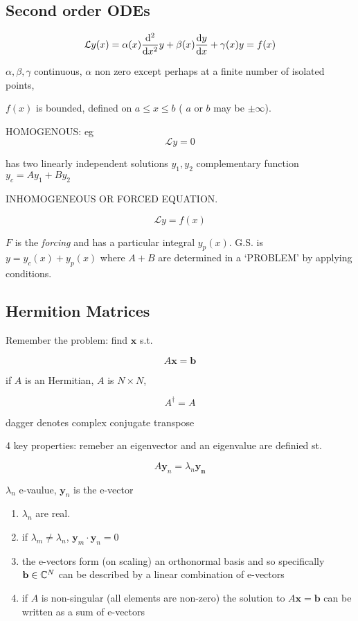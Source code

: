 \documentclass[a4paper]{article}
\begin{document}
\subsection{Second order ODEs}

\[ \mathcal{L} y(x) = \alpha(x) \frac{\mathrm{d}^{2} }{\mathrm{d} x^{2} } y + \beta(x) \frac{\mathrm{d} y }{\mathrm{d} x } + \gamma(x)  y = f(x) \]

$ \alpha, \beta, \gamma $ continuous, $ \alpha $ non zero except perhaps at a finite number of isolated points, 

$ f(x) $ is bounded, defined on $ a \leq x \leq b $ ( $ a $ or $ b $ may be $ \pm \infty $).

HOMOGENOUS: eg 
\[ \mathcal{L} y = 0  \]

has two linearly independent solutions $ y_{1},y_{2} $ complementary function $ y_{c} = Ay_{1} + By_{2} $

INHOMOGENEOUS OR FORCED EQUATION. 

\[ \mathcal{L} y = f(x)  \]

$ F $ is the \emph{forcing} and has a particular integral $ y_{p} (x) $. G.S. is $ y = y_{c}(x) + y_{p}(x) $ where $ A + B $ are determined in a `PROBLEM' by applying conditions.


\subsection{Hermition Matrices}

Remember the problem: find $ \mathbf{x} $ s.t. 

\[ A \mathbf{x} = \mathbf{b} \]

if $ A $ is an Hermitian, $ A  $ is $ N \times N $,

\[ A^{\dag} = A \]

dagger denotes complex conjugate transpose

4 key properties: remeber an eigenvector and an eigenvalue are definied st.

\[ A \mathbf{y}_{n} = \lambda_{n} \mathbf{y_{n}} \]

$ \lambda_{n} $ e-vaulue, $ \mathbf{y}_{n} $ is the e-vector

\begin{enumerate}
	\item $ \lambda_{n} $ are real.
	\item if $ \lambda_{m} \neq \lambda_{n} $, $ \mathbf{y}_{m} \cdot \mathbf{y}_{n} = 0 $
	\item the e-vectors form (on scaling) an orthonormal basis and so specifically $ \mathbf{b} \in \mathbb{C}^{N} $ can be described by a linear combination of e-vectors
	\item if $ A $ is non-singular (all elements are non-zero) the solution to $ A \mathbf{x} = \mathbf{b} $ can be written as a sum of e-vectors
\end{enumerate}
\end{document}
